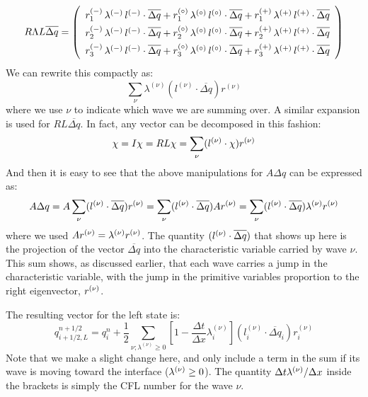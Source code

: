 \begin{equation}
\renewcommand{\arraystretch}{1.5}
R\Lambda L \overline{\Delta q} =
   \left ( \begin{array}{c}
            r_1^\evm \, \lambda^\evm \, l^\evm \cdot \overline{\Delta q} +
            r_1^\evz \, \lambda^\evz \, l^\evz \cdot \overline{\Delta q} +
            r_1^\evp \, \lambda^\evp \, l^\evp \cdot \overline{\Delta q} \\
%
            r_2^\evm \, \lambda^\evm \, l^\evm \cdot \overline{\Delta q} +
            r_2^\evz \, \lambda^\evz \, l^\evz \cdot \overline{\Delta q} +
            r_2^\evp \, \lambda^\evp \, l^\evp \cdot \overline{\Delta q} \\
%
            r_3^\evm \, \lambda^\evm \, l^\evm \cdot \overline{\Delta q} +
            r_3^\evz \, \lambda^\evz \, l^\evz \cdot \overline{\Delta q} +
            r_3^\evp \, \lambda^\evp \, l^\evp \cdot \overline{\Delta q} \\
   \end{array} \right )
\renewcommand{\arraystretch}{1.0}
\end{equation}
We can rewrite this compactly as:
\begin{equation}
\sum_\nu \lambda^{(\nu)} (l^{(\nu)} \cdot \overline{\Delta q}) r^{(\nu)}
\end{equation}
where we use $\nu$ to indicate which wave we are summing over.  A similar 
expansion is used for $RL \overline{\Delta q}$.  In fact, any vector
can be decomposed in this fashion:
\begin{equation}
\chi = I \chi = R L \chi = \sum_\nu (l^{(\nu)} \cdot \chi) r^{(\nu)}
\end{equation}
And then it is easy to see that the above manipulations for $A \Delta q$
can be expressed as:
\begin{equation}
A \Delta q =  A \sum_\nu (l^{(\nu)} \cdot \overline{\Delta q}) r^{(\nu)} = \sum_\nu (l^{(\nu)} \cdot \overline{\Delta q}) A r^{(\nu)} = \sum_\nu (l^{(\nu)} \cdot \overline{\Delta q}) \lambda^{(\nu)} r^{(\nu)}
\end{equation} 
where we used $A r^{(\nu)} = \lambda^{(\nu)} r^{(\nu)}$.  The quantity $(l^{(\nu)}
\cdot \overline{\Delta q})$ that shows up here is the projection of
the vector $\overline{\Delta q}$ into the characteristic variable
carried by wave $\nu$.  This sum shows, as discussed earlier, that each wave
carries a jump in the characteristic variable, with the jump in the primitive
variables proportion to the right eigenvector, $r^{(\nu)}$.

The resulting vector
for the left state is:
\begin{equation}
q_{i+1/2,L}^{n+1/2} = q_i^n + \frac{1}{2} \sum_{\nu; \lambda^{(\nu)} \ge 0} 
  \left [ 1 - \frac{\Delta t}{\Delta x} \lambda_i^{(\nu)} \right ] (l_i^{(\nu)} \cdot \overline{\Delta q}_i) r_i^{(\nu)} 
\end{equation}
Note that we make a slight change here, and only include a term in the sum if
its wave is moving toward the interface ($\lambda^{(\nu)} \ge 0$).  The quantity
$\Delta t \lambda^{(\nu)}/\Delta x$ inside the brackets is simply the CFL
number for the wave $\nu$.

